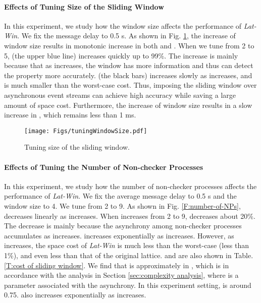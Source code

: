 \documentclass[12pt,journal,letterpaper,compsoc]{IEEEtran}
\begin{document}
\paragraph{Effects of Tuning Size of the Sliding Window}

In this experiment, we study how the window size affects the performance of {\it Lat-Win}. We fix the message delay to 0.5 s. As shown in Fig. \ref{F:window-size}, the increase of window size  results in monotonic increase in both  and . When we tune  from 2 to 5,  (the upper blue line) increases quickly up to 99\%. The increase is mainly because that as  increases, the window has more information and thus can detect the property more accurately.  (the black bars) increases slowly as  increases, and is much smaller than the worst-case cost. Thus, imposing the sliding window over asynchronous event streams can achieve high accuracy while saving a large amount of space cost. Furthermore, the increase of window size results in a slow increase in , which remains less than 1 ms.

\begin{figure}[htbp]
\begin{center}
  \texttt{[image: Figs/tuningWindowSize.pdf]}\\
  \centering\parbox[c]{3in}{\caption{Tuning size of the sliding window.}}
  \label{F:window-size}
\end{center}
\end{figure}

\paragraph{Effects of Tuning the Number of Non-checker Processes}

In this experiment, we study how the number of non-checker processes  affects the performance of {\it Lat-Win}. We fix the average message delay to 0.5 s and the window size  to 4. We tune  from 2 to 9. As shown in Fig. \ref{F:number-of-NPs},  decreases linearly as  increases. When  increases from 2 to 9,  decreases about 20\%. The decrease is mainly because the asynchrony among non-checker processes accumulates as  increases.  increases exponentially as  increases. However, as  increases, the space cost of {\it Lat-Win} is much less than the worst-case (less than 1\%), and even less than that of the original lattice.  and  are also shown in Table. \ref{T:cost of sliding window}. We find that  is approximately in , which is in accordance with the analysis in Section \ref{sec:complexity analysis}, where  is a parameter associated with the asynchrony. In this experiment setting,  is around 0.75.  also increases exponentially as  increases.
\end{document}
